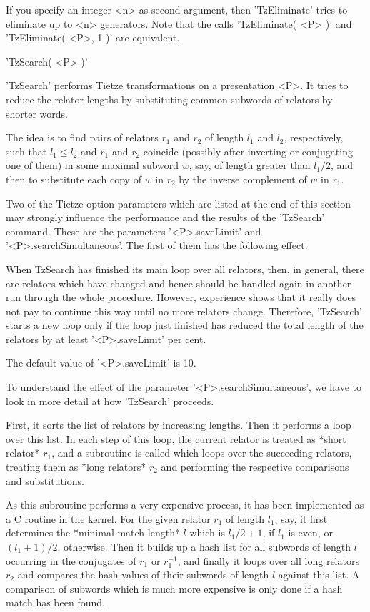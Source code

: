 If you  specify an  integer  <n>  as second argument,  then 'TzEliminate'
tries  to   eliminate   up  to   <n>  generators.  Note  that  the  calls
'TzEliminate( <P> )' and 'TzEliminate( <P>, 1 )' are equivalent.

\vspace{5mm}
'TzSearch( <P> )'%

'TzSearch'  performs Tietze transformations  on  a  presentation <P>.  It
tries to reduce the relator lengths by  substituting  common  subwords of
relators by shorter words.

The idea is to find pairs of relators $r_1$ and $r_2$ of length $l_1$ and
$l_2$, respectively, such that $l_1 \le l_2$ and $r_1$ and $r_2$ coincide
(possibly  after inverting or conjugating one of  them)  in some  maximal
subword $w$, say, of length  greater than $l_1/2$, and then to substitute
each copy of $w$ in $r_2$ by the inverse complement of $w$ in $r_1$.

Two of the  Tietze option parameters which  are listed at the end of this
section may  strongly  influence the performance and  the results of  the
'TzSearch'  command.   These  are   the  parameters  '<P>.saveLimit'  and
'<P>.searchSimultaneous'.  The first of them has the following effect.

When TzSearch  has  finished  its main  loop over  all relators, then, in
general, there are  relators which  have  changed  and  hence  should  be
handled  again in  another run  through  the  whole  procedure.  However,
experience shows that it really does  not pay  to continue this way until
no more relators change.  Therefore, 'TzSearch' starts a new loop only if
the loop just finished has reduced the total length of the relators by at
least '<P>.saveLimit' per cent.

The default value of '<P>.saveLimit' is 10.

To understand the  effect of  the parameter '<P>.searchSimultaneous',  we
have to look in more detail at how 'TzSearch' proceeds.

First,  it sorts  the  list of  relators by increasing lengths.   Then it
performs a loop  over this list.  In each step  of this loop, the current
relator  is treated as *short  relator* $r_1$, and a subroutine is called
which  loops  over  the  succeeding  relators,  treating  them  as  *long
relators*   $r_2$   and  performing   the   respective   comparisons  and
substitutions.

As  this  subroutine performs a  very  expensive  process,  it  has  been
implemented  as a C routine in the  {\GAP} kernel.  For the given relator
$r_1$ of  length $l_1$,  say,  it  first  determines  the  *minimal match
length*  $l$  which  is  $l_1/2+1$,  if  $l_1$  is  even, or $(l_1+1)/2$,
otherwise.  Then it builds  up a hash list for all subwords of length $l$
occurring in the conjugates of  $r_1$ or $r_1^{-1}$, and finally it loops
over all long  relators  $r_2$ and  compares the  hash  values  of  their
subwords of length $l$ against this list.  A comparison of subwords which
is much more expensive is only done if a hash match has been found.

